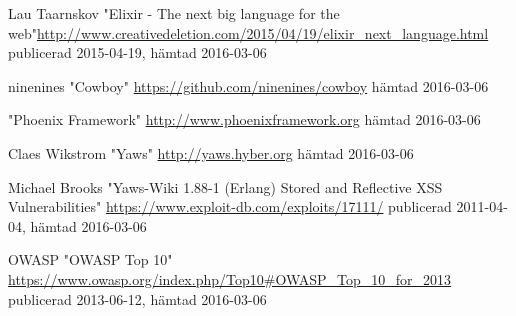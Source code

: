\documentclass[12pt]{article}
\begin{document}
\begin{thebibliography}{99}
 Lau Taarnskov "Elixir - The next big language for the web"\url{http://www.creativedeletion.com/2015/04/19/elixir_next_language.html}
publicerad  2015-04-19,
hämtad 2016-03-06



ninenines "Cowboy" \url{https://github.com/ninenines/cowboy}
hämtad 2016-03-06



  "Phoenix Framework" \url{http://www.phoenixframework.org}
hämtad 2016-03-06

 Claes Wikstrom "Yaws" \url{http://yaws.hyber.org}
hämtad 2016-03-06

 Michael Brooks "Yaws-Wiki 1.88-1 (Erlang) Stored and Reflective XSS Vulnerabilities"  \url{https://www.exploit-db.com/exploits/17111/}
publicerad 2011-04-04,
hämtad 2016-03-06

 OWASP "OWASP Top 10" \url{https://www.owasp.org/index.php/Top10#OWASP_Top_10_for_2013}
publicerad 2013-06-12,
hämtad 2016-03-06

\end{thebibliography}
\end{document}
